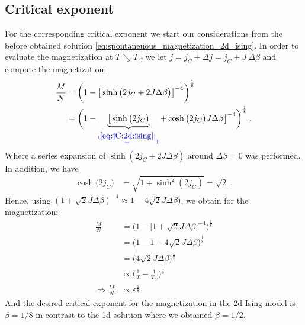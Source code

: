 \subsection{Critical exponent \label{sec:Ising:2D:beta}}
For the corresponding critical exponent we start our considerations from the before obtained solution \autoref{eq:spontaneuous_magnetization_2d_ising}. In order to evaluate the magnetization at $T\searrow T_{C}$ we let $j = j_C + \Delta j = j_C + J~\Delta\beta$ and compute the magnetization:
%
\begin{align*}
\frac{M}{N} &= \bigg( 1 - \big[\sinh\big( 2 j_{C} + 2J\Delta \beta  \big)\big]^{-4} \bigg)^{\frac{1}{8}}\\
&= \bigg( 1 - \underbrace{
\big[\sinh\big( 2 j_{C}\big)
}_{\color{blue} \overset{(\ref{eq:jC:2d:ising})}{=} 1} + \cosh\big(2j_{C}  \big) J\Delta \beta\big]^{-4} \bigg)^{\frac{1}{8}}\;.
\end{align*}
%
Where a series expansion of $\sinh(2j_C + 2J\Delta\beta)$ around $\Delta\beta=0$ was performed. In addition, we have 
%
\begin{align*}
\cosh\big( 2 j_{C} \big) &= \sqrt{1+\sinh^{2}(2 j_{C})} = \sqrt{2}\;.
\end{align*}
%
Hence, using $(1+\sqrt{2}J\Delta\beta)^{-4} \approx 1 - 4\sqrt{2}J\Delta\beta)$, we obtain for the magnetization:
%
\begin{align*}
\frac{M}{N} &=\bigg( 1 - \big[ 1 + \sqrt{2} J \Delta\beta \big]^{-4} \bigg)^{\frac{1}{8}}\\
&=\bigg( 1 - 1 +4\sqrt{2}  J \Delta\beta  \bigg)^{\frac{1}{8}}\\
&=\bigg(4\sqrt{2}  J \Delta\beta  \bigg)^{\frac{1}{8}}\\
&\propto  \big(\frac{1}{T}-\frac{1}{T_{C}}\big)   ^{\frac{1}{8}}\\
\Rightarrow \frac{M}{N} &\propto \varepsilon^{\frac{1}{8}}
\end{align*}
%
And the desired critical exponent for the magnetization in the 2d Ising model is $\beta = 1/8$ in contrast to the 1d solution where we obtained $\beta = 1/2$.
